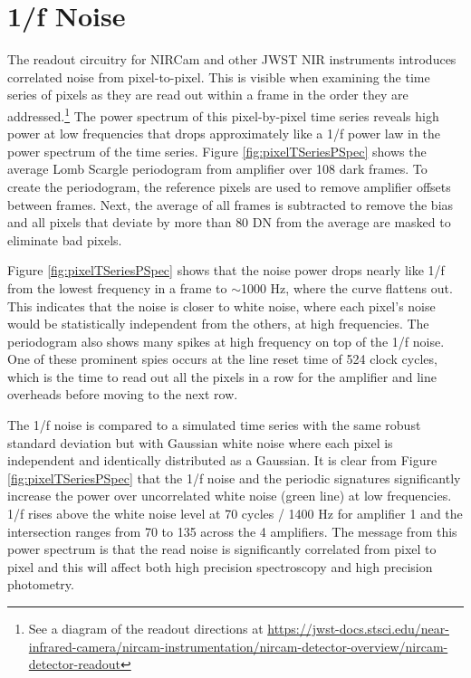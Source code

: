 \documentclass{aastex62}
\begin{document}
\clearpage
\section{1/f Noise}
The readout circuitry for NIRCam and other JWST NIR instruments introduces correlated noise from pixel-to-pixel.
This is visible when examining the time series of pixels as they are read out within a frame in the order they are addressed.\footnote{See a diagram of the readout directions at \url{https://jwst-docs.stsci.edu/near-infrared-camera/nircam-instrumentation/nircam-detector-overview/nircam-detector-readout}}
The power spectrum of this pixel-by-pixel time series reveals high power at low frequencies that drops approximately like a 1/f power law in the power spectrum of the time series.
Figure \ref{fig:pixelTSeriesPSpec} shows the average Lomb Scargle periodogram from amplifier over 108 dark frames.
To create the periodogram, the reference pixels are used to remove amplifier offsets between frames.
Next, the average of all frames is subtracted to remove the bias and all pixels that deviate by more than 80 DN from the average are masked to eliminate bad pixels.

Figure \ref{fig:pixelTSeriesPSpec} shows that the noise power drops nearly like 1/f from the lowest frequency in a frame to $\sim$1000 Hz, where the curve flattens out.
This indicates that the noise is closer to white noise, where each pixel's noise would be statistically independent from the others, at high frequencies.
The periodogram also shows many spikes at high frequency on top of the 1/f noise.
One of these prominent spies occurs at the line reset time of 524 clock cycles, which is the time to read out all the pixels in a row for the amplifier and line overheads before moving to the next row.

The 1/f noise is compared to a simulated time series with the same robust standard deviation but with Gaussian white noise where each pixel is independent and identically distributed as a Gaussian.
It is clear from Figure \ref{fig:pixelTSeriesPSpec} that the 1/f noise and the periodic signatures significantly increase the power over uncorrelated white noise (green line) at low frequencies.
1/f rises above the white noise level at 70 cycles / 1400 Hz for amplifier 1 and the intersection ranges from 70 to 135 across the 4 amplifiers.
The message from this power spectrum is that the read noise is significantly correlated from pixel to pixel and this will affect both high precision spectroscopy and high precision photometry.
\end{document}
